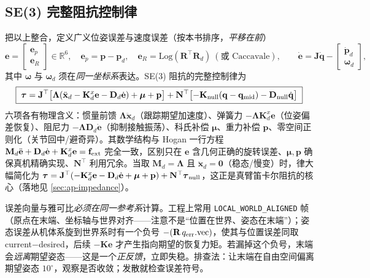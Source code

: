 \subsection{SE(3) 完整阻抗控制律}
\label{sec:os-se3-law}

把以上整合，定义广义位姿误差与速度误差（按本书排序，\emph{平移在前}）
\begin{equation}
  \mathbf e=\begin{bmatrix}\mathbf e_p\\\mathbf e_R\end{bmatrix}\in\mathbb R^6,\quad
  \mathbf e_p=\mathbf p-\mathbf p_d,\quad
  \mathbf e_R=\mathrm{Log}(\mathbf R^\top\mathbf R_d)\ (\text{或 Caccavale}),\qquad
  \dot{\mathbf e}=\mathbf J\dot{\mathbf q}-\begin{bmatrix}\dot{\mathbf p}_d\\\boldsymbol\omega_d\end{bmatrix},
  \label{eq:os-se3-error}
\end{equation}
其中 $\boldsymbol\omega$ 与 $\boldsymbol\omega_d$ 须在\emph{同一坐标系}表达。SE(3) 阻抗的完整控制律为
\begin{equation}
  \boxed{\;\boldsymbol\tau=\mathbf J^\top\bigl[\boldsymbol\Lambda(\ddot{\mathbf x}_d-\mathbf K_d^x\mathbf e-\mathbf D_d\dot{\mathbf e})+\boldsymbol\mu+\mathbf p\bigr]+\mathbf N^\top\bigl[-\mathbf K_{\rm null}(\mathbf q-\mathbf q_{\rm mid})-\mathbf D_{\rm null}\dot{\mathbf q}\bigr]\;}
  \label{eq:os-se3-impedance}
\end{equation}
六项各有物理含义：惯量前馈 $\boldsymbol\Lambda\ddot{\mathbf x}_d$（跟踪期望加速度）、弹簧力 $-\boldsymbol\Lambda\mathbf K_d^x\mathbf e$（位姿偏差恢复）、阻尼力 $-\boldsymbol\Lambda\mathbf D_d\dot{\mathbf e}$（抑制接触振荡）、科氏补偿 $\boldsymbol\mu$、重力补偿 $\mathbf p$、零空间正则化（关节回中/避奇异）。其数学结构与 Hogan 一行方程 $\mathbf M_d\ddot{\mathbf e}+\mathbf D_d\dot{\mathbf e}+\mathbf K_d^x\mathbf e=\mathbf f_{\rm ext}$ 完全一致，区别只在 $\mathbf e$ 含几何正确的旋转误差、$\boldsymbol\mu,\mathbf p$ 确保真机精确实现、$\mathbf N^\top$ 利用冗余。当取 $\mathbf M_d=\boldsymbol\Lambda$ 且 $\ddot{\mathbf x}_d=\mathbf 0$（稳态/慢变）时，律大幅简化为 $\boldsymbol\tau=\mathbf J^\top(-\mathbf K_d^x\mathbf e-\mathbf D_d\dot{\mathbf e}+\boldsymbol\mu+\mathbf p)+\mathbf N^\top\boldsymbol\tau_{\rm null}$，这正是真臂笛卡尔阻抗的核心（落地见 \cref{sec:ap-impedance}）。

\begin{pitfall}
误差向量与雅可比\emph{必须在同一参考系}计算。工程上常用 \texttt{LOCAL\_WORLD\_ALIGNED} 帧（原点在末端、坐标轴与世界对齐——注意不是“位置在世界、姿态在末端”）；姿态误差从机体系旋到世界系时有一个负号 $-(\mathbf R\,q_{\rm err}.\mathrm{vec})$，使其与位置误差同取 current$-$desired，后续 $-\mathbf K\mathbf e$ 才产生指向期望的恢复力矩。若漏掉这个负号，末端会\emph{远离}期望姿态——这是一个\emph{正反馈}，立即失稳。排查法：让末端在自由空间偏离期望姿态 $10^\circ$，观察是否收敛；发散就检查误差符号。
\end{pitfall}

